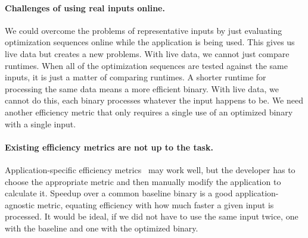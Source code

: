 
    \paragraph{Challenges of using real inputs online.} We could overcome the problems of representative inputs by just evaluating
    optimization sequences online while the application is being used. 
    This gives us live data but creates a new problems.
    With live data, we cannot just compare runtimes. 
    When all of the optimization sequences are tested against the same inputs, it is just a matter of comparing runtimes.
    A shorter runtime for processing the same data means a more efficient binary.
    With live data, we cannot do this, each binary processes
    whatever the input happens to be. We need another efficiency metric that only requires a single use of an optimized binary with a
    single input.

    \paragraph{Existing efficiency metrics are not up to the task.} Application-specific efficiency metrics~\cite{alameldeen06,coppa14} may
    work well, but the developer has to choose the appropriate metric and then manually modify the application to calculate it. Speedup
    over a common baseline binary is a good application-agnostic metric, equating efficiency with how much faster a given input is
    processed. It would be ideal, if we did not have to use the same input twice, one with the baseline and one with the optimized binary.
    
